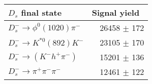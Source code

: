  \begin{tabular}{l r }
\hline\hline
$D_s$ final state  & Signal yield\ \\
\hline
$D_{s}^{-} \to \phi^{0}(1020)\pi^{-}$ & 26458 $\pm$ 172 \\
$D_{s}^{-}\to K^{*0}(892)K^{-}$ & 23105 $\pm$ 170 \\
$D_{s}^{-}\to (K^{-}h^{+}\pi^{-})$ & 15201 $\pm$ 136 \\
$D_{s}^{-}\to \pi^{+}\pi^{-}\pi^{-}$ & 12461 $\pm$ 122 \\
\hline\hline
\end{tabular}
\label{table:normYieldsDs}
